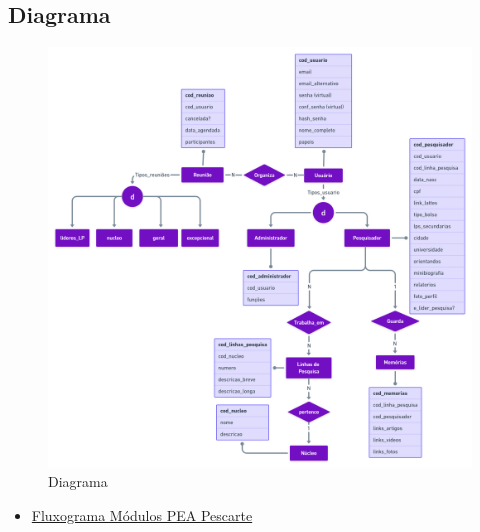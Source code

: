 \documentclass[11pt]{../../classes/ifscarticle}
\begin{document}
\subsection{Diagrama}
\begin{figure}[h]
    \centering
    \includegraphics[width=17cm]{figuras/Diagrama.png}
    \caption{Diagrama}
    \label{fig:logolatex}
\end{figure}
\clearpage



\begin{itemize}
    \item \href{https://github.com/cciuenf/pea_pescarte/blob/main/doc_projeto/documentos/fluxograma_modulos.pdf}{Fluxograma Módulos PEA Pescarte }
   
\end{itemize}
\end{document}
